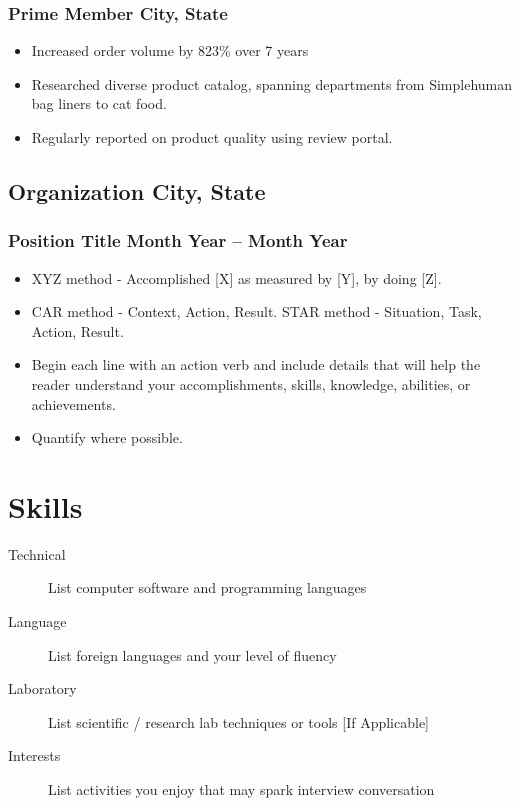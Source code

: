\documentclass[11pt]{article}
\begin{document}
\subsubsection{Prime Member \hfill City, State}
\begin{itemize}
    \item Increased order volume by 823\% over 7 years 
    \item Researched diverse product catalog, spanning departments from Simplehuman bag liners to cat food. 
    \item Regularly reported on product quality using review portal.
\end{itemize}

\subsection{Organization \hfill City, State}
\subsubsection{Position Title \hfill Month Year – Month Year}
\begin{itemize}
    \item XYZ method - Accomplished [X] as measured by [Y], by doing [Z].
    \item CAR method - Context, Action, Result. STAR method - Situation, Task, Action, Result.
    \item Begin each line with an action verb and include details that will help the reader understand your accomplishments, skills, knowledge, abilities, or achievements.
    \item Quantify where possible.
\end{itemize}

\section{Skills}
\begin{description}
    \item[Technical] List computer software and programming languages 
    \item[Language] List foreign languages and your level of fluency
    \item[Laboratory] List scientific / research lab techniques or tools [If Applicable]
    \item[Interests] List activities you enjoy that may spark interview conversation
\end{description}
\end{document}

